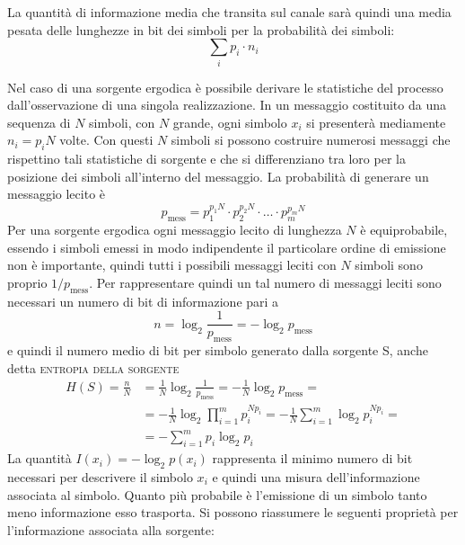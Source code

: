 La quantità di informazione media che transita sul canale sarà quindi una media pesata delle lunghezze in bit dei simboli per la probabilità dei simboli: \[\sum_{i}p_i\cdot n_i\]

Nel caso di una sorgente ergodica è possibile derivare le statistiche del processo dall'osservazione di una singola realizzazione. In un messaggio costituito da una sequenza di $N$ simboli, con $N$ grande, ogni simbolo $x_i$ si presenterà mediamente $n_i=p_i N$ volte. Con questi $N$ simboli si possono costruire numerosi messaggi che rispettino tali statistiche di sorgente e che si differenziano tra loro per la posizione dei simboli all'interno del messaggio. La probabilità di generare un messaggio lecito è
\begin{equation}p_\text{mess}=p_1^{p_1 N}\cdot p_2^{p_2 N}\cdot\dots\cdot p_m^{p_m N}\end{equation}
Per una sorgente ergodica ogni messaggio lecito di lunghezza $N$ è equiprobabile, essendo i simboli emessi in modo indipendente il particolare ordine di emissione non è importante, quindi tutti i possibili messaggi leciti con $N$ simboli sono proprio $1/p_\text{mess}$.
Per rappresentare quindi un tal numero di messaggi leciti sono necessari un numero di bit di informazione pari a
\[n=\log_2\frac{1}{p_\text{mess}}=-\log_2 p_\text{mess}\]
e quindi il numero medio di bit per simbolo generato dalla sorgente S, anche detta \textsc{entropia della sorgente}
\begin{equation}\begin{split}
H(S)=\frac{n}{N}&=\frac{1}{N}\log_2\frac{1}{p_\text{mess}}=-\frac{1}{N}\log_2 p_\text{mess}=\\
&=-\frac{1}{N}\log_2\prod_{i=1}^{m}p_i^{N p_i}=-\frac{1}{N}\sum_{i=1}^{m}\log_2 p_i^{N p_i}=\\
&=-\sum_{i=1}^{m}p_i\log_2 p_i
\end{split}\end{equation}
La quantità $I(x_i)=-\log_2 p(x_i)$ rappresenta il minimo numero di bit necessari per descrivere il simbolo $x_i$ e quindi una misura dell'informazione associata al simbolo. Quanto più probabile è l'emissione di un simbolo tanto meno informazione esso trasporta. Si possono riassumere le seguenti proprietà per l'informazione associata alla sorgente:
